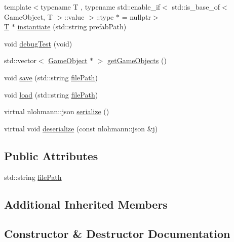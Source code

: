 \begin{DoxyCompactItemize}
\item 
{\footnotesize template$<$typename T , typename std\+::enable\+\_\+if$<$ std\+::is\+\_\+base\+\_\+of$<$ Game\+Object, T $>$\+::value $>$\+::type $\ast$  = nullptr$>$ }\\\mbox{\hyperlink{namespace_beer_engine_a94f0b552f6dc910de8cdb44207981f53a8de48e594408f9fc561b2f68ce05f664}{T}} $\ast$ \mbox{\hyperlink{class_beer_engine_1_1_a_scene_acf89d3198589c3e3007b0bc0579dd9ab}{instantiate}} (std\+::string prefab\+Path)
\item 
void \mbox{\hyperlink{class_beer_engine_1_1_a_scene_a44f55dbd991eb07e425ca163f4773766}{debug\+Test}} (void)
\item 
std\+::vector$<$ \mbox{\hyperlink{class_beer_engine_1_1_game_object}{Game\+Object}} $\ast$ $>$ \mbox{\hyperlink{class_beer_engine_1_1_a_scene_ae551bf1b3e7cf87cc2de4b6859732e81}{get\+Game\+Objects}} ()
\item 
void \mbox{\hyperlink{class_beer_engine_1_1_a_scene_a65e03ade02de4673cd25544d4843c6d8}{save}} (std\+::string \mbox{\hyperlink{class_beer_engine_1_1_a_scene_a2edf1030b7232a5f703d327976f1d4ea}{file\+Path}})
\item 
void \mbox{\hyperlink{class_beer_engine_1_1_a_scene_aeedbe75eeef457353645d61a68bc2949}{load}} (std\+::string \mbox{\hyperlink{class_beer_engine_1_1_a_scene_a2edf1030b7232a5f703d327976f1d4ea}{file\+Path}})
\item 
virtual nlohmann\+::json \mbox{\hyperlink{class_beer_engine_1_1_a_scene_ae876ec81592c80e7346f05c56bdaa929}{serialize}} ()
\item 
virtual void \mbox{\hyperlink{class_beer_engine_1_1_a_scene_a3db491adb7ff57a3a527024fd0a6001f}{deserialize}} (const nlohmann\+::json \&j)
\end{DoxyCompactItemize}
\subsection*{Public Attributes}
\begin{DoxyCompactItemize}
\item 
std\+::string \mbox{\hyperlink{class_beer_engine_1_1_a_scene_a2edf1030b7232a5f703d327976f1d4ea}{file\+Path}}
\end{DoxyCompactItemize}
\subsection*{Additional Inherited Members}


\subsection{Constructor \& Destructor Documentation}
\mbox{\label{class_beer_engine_1_1_a_scene_a811f775c81c6d46b267e1926450a7c32}} 
